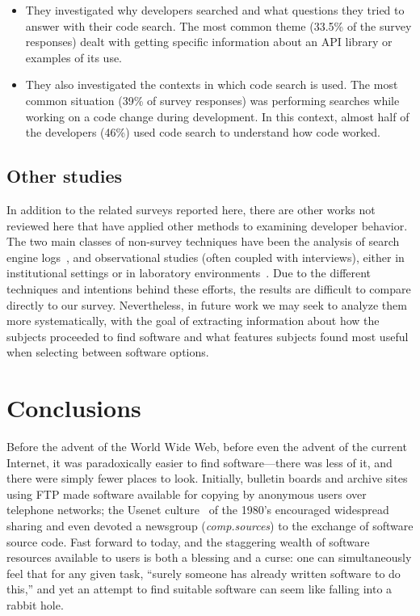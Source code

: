 \documentclass{casicswhitepaper}
\begin{document}
\begin{itemize}

\item They investigated why developers searched and what questions they tried to answer with their code search.  The most common theme (33.5\% of the survey responses) dealt with getting specific information about an API library or examples of its use.

\item They also investigated the contexts in which code search is used.  The most common situation (39\% of survey responses) was performing searches while working on a code change during development.  In this context, almost half of the developers (46\%) used code search to understand how code worked.

\end{itemize}


\subsection{Other studies}

In addition to the related surveys reported here, there are other works not reviewed here that have applied other methods to examining developer behavior.  The two main classes of non-survey techniques have been the analysis of search engine logs~\cite{bajrachary_2009, bajracharya2012analyzing, jansen_2006, teevan_2004, brandt2009two, brandt2010example, Li2009751, ge2014developers, volske2015users}, and observational studies (often coupled with interviews), either in institutional settings or in laboratory environments~\cite{sim_2011, brandt2009two, banker1993repository, gallardo2013software, sherif2003barriers, pohthong2001reuse, sim2013controlled, murphyhill2015how, sim2011getting, dabbish_2012}.  Due to the different techniques and intentions behind these efforts, the results are difficult to compare directly to our survey.  Nevertheless, in future work we may seek to analyze them more systematically, with the goal of extracting information about how the subjects proceeded to find software and what features subjects found most useful when selecting between software options.


\section{Conclusions}

Before the advent of the World Wide Web, before even the advent of the current Internet, it was paradoxically easier to find software---there was less of it, and there were simply fewer places to look.  Initially, bulletin boards and archive sites using FTP made software available for copying by anonymous users over telephone networks; the Usenet culture~\cite{emerson1983usenet} of the 1980's encouraged widespread sharing and even devoted a newsgroup (\emph{comp.sources}) to the exchange of software source code.  Fast forward to today, and the staggering wealth of software resources available to users is both a blessing and a curse: one can simultaneously feel that for any given task, ``surely someone has already written software to do this,'' and yet an attempt to find suitable software can seem like falling into a rabbit hole.
\end{document}
